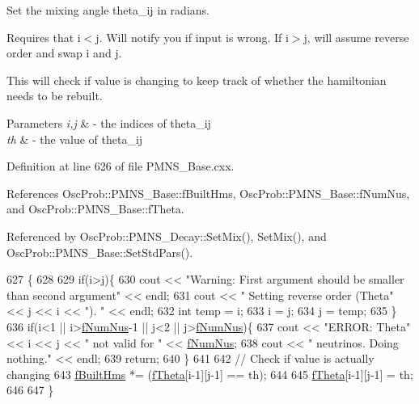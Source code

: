 Set the mixing angle theta\+\_\+ij in radians.

Requires that i$<$j. Will notify you if input is wrong. If i$>$j, will assume reverse order and swap i and j.

This will check if value is changing to keep track of whether the hamiltonian needs to be rebuilt.


\begin{DoxyParams}{Parameters}
{\em i,j} & -\/ the indices of theta\+\_\+ij \\
\hline
{\em th} & -\/ the value of theta\+\_\+ij \\
\hline
\end{DoxyParams}


Definition at line 626 of file P\+M\+N\+S\+\_\+\+Base.\+cxx.



References Osc\+Prob\+::\+P\+M\+N\+S\+\_\+\+Base\+::f\+Built\+Hms, Osc\+Prob\+::\+P\+M\+N\+S\+\_\+\+Base\+::f\+Num\+Nus, and Osc\+Prob\+::\+P\+M\+N\+S\+\_\+\+Base\+::f\+Theta.



Referenced by Osc\+Prob\+::\+P\+M\+N\+S\+\_\+\+Decay\+::\+Set\+Mix(), Set\+Mix(), and Osc\+Prob\+::\+P\+M\+N\+S\+\_\+\+Base\+::\+Set\+Std\+Pars().


\begin{DoxyCode}
627 \{
628 
629   \textcolor{keywordflow}{if}(i>j)\{
630     cout << \textcolor{stringliteral}{"Warning: First argument should be smaller than second argument"} << endl;
631     cout << \textcolor{stringliteral}{"         Setting reverse order (Theta"} << j << i << \textcolor{stringliteral}{"). "} << endl;
632     \textcolor{keywordtype}{int} temp = i;
633     i = j;
634     j = temp;
635   \}
636   \textcolor{keywordflow}{if}(i<1 || i>\hyperlink{classOscProb_1_1PMNS__Base_a24bb74bed63569dfe88b18fa6a08060e}{fNumNus}-1 || j<2 || j>\hyperlink{classOscProb_1_1PMNS__Base_a24bb74bed63569dfe88b18fa6a08060e}{fNumNus})\{
637     cout << \textcolor{stringliteral}{"ERROR: Theta"} << i << j << \textcolor{stringliteral}{" not valid for "} << \hyperlink{classOscProb_1_1PMNS__Base_a24bb74bed63569dfe88b18fa6a08060e}{fNumNus};
638     cout << \textcolor{stringliteral}{" neutrinos. Doing nothing."} << endl;
639     \textcolor{keywordflow}{return};
640   \}
641 
642   \textcolor{comment}{// Check if value is actually changing}
643   \hyperlink{classOscProb_1_1PMNS__Base_a9ac3cadeac8db1b90f3152f476244780}{fBuiltHms} *= (\hyperlink{classOscProb_1_1PMNS__Base_a1976887cd658dd86b2336c181f1470b4}{fTheta}[i-1][j-1] == th);
644 
645   \hyperlink{classOscProb_1_1PMNS__Base_a1976887cd658dd86b2336c181f1470b4}{fTheta}[i-1][j-1] = th;
646 
647 \}
\end{DoxyCode}
\mbox{\label{classOscProb_1_1PMNS__Base_aba565962a440d14bee7a2a96d2eca2c5}} 
